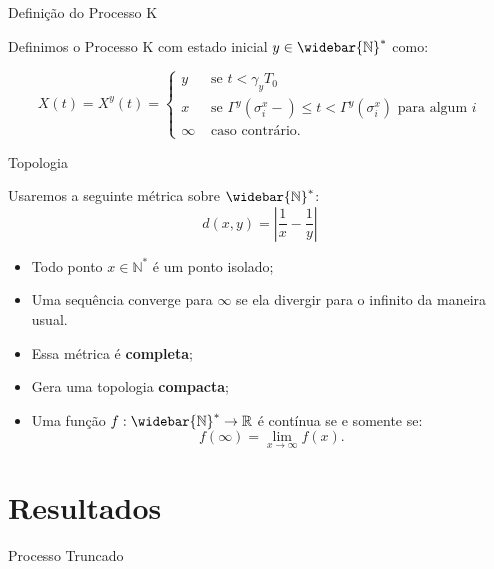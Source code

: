 \documentclass[xcolor=pdftex,dvipsnames]{beamer}
\newcommand{\Nz}{{\mathbb{N^*}}}
\newcommand{\Nzb}{{\mathbb{\widebar{N}^*}}}
\newcommand{\R}{{\mathbb{R}}}
\begin{document}
\begin{frame}{Definição do Processo K}
  
  Definimos o Processo K com estado inicial $y \in \Nzb$ como:

  \begin{displaymath}
    X(t) = X^y (t) =
    \begin{cases}
      y & \textrm{ se }  t < \gamma_y T_0\\
      x & \textrm{ se } \Gamma^y(\sigma_i^x-) \leq t <
      \Gamma^y(\sigma^x_i)
      \textrm{ para algum } i \\
      \infty & \textrm{ caso contrário.}
    \end{cases}
  \end{displaymath}
\end{frame}

\begin{frame}{Topologia}
  
  Usaremos a seguinte métrica sobre $\Nzb$:
  \begin{displaymath}
    d(x, y) = \left\lvert \frac{1}{x} - \frac{1}{y} \right\rvert
  \end{displaymath}


  \begin{itemize}
  \item<2-> Todo ponto $x \in \Nz$ é um ponto isolado;
  \item<3-> Uma sequência converge para $\infty$ se ela divergir para o
    infinito da maneira usual.
  \item<4-> Essa métrica é {\bf completa};
  \item<5-> Gera uma topologia {\bf compacta};
  \item<6-> Uma função $f: \Nzb \to \R$ é contínua se e somente se:
    \begin{displaymath}
      f(\infty) = \lim_{x \to \infty} f(x) .
    \end{displaymath}
  \end{itemize}

\end{frame}

\section{Resultados}

\begin{frame}{Processo Truncado}


\end{frame}
\end{document}
